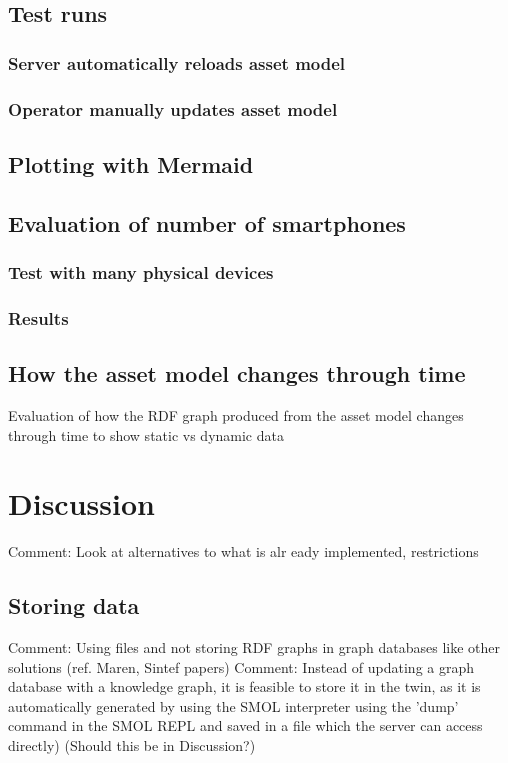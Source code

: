 \documentclass{article}
\begin{document}
\subsection{Test runs}
\subsubsection{Server automatically reloads asset model}
\subsubsection{Operator manually updates asset model}
\subsection{Plotting with Mermaid}
\subsection{Evaluation of number of smartphones}
\subsubsection{Test with many physical devices}
\subsubsection{Results}
\subsection{How the asset model changes through time}
Evaluation of how the RDF graph produced from the asset model changes through time to show static vs dynamic data




\newpage
\section{Discussion}\label{sec:Discussion}
Comment: Look at alternatives to what is alr eady implemented, restrictions
\subsection{Storing data}\label{subsec:StoringData}
Comment: Using files and not storing RDF graphs in graph databases like other solutions (ref. Maren, Sintef papers)
Comment: Instead of updating a graph database with a knowledge graph, it is feasible to store it in the twin, as it is automatically generated by using the SMOL interpreter using the 'dump' command in the SMOL REPL and saved in a file which the server can access directly) (Should this be in Discussion?)
\end{document}
